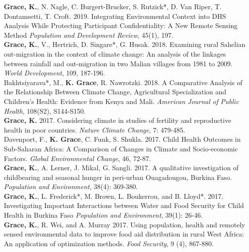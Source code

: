 \documentclass[11pt]{article} %
\begin{document}
\noindent
\textbf{Grace, K.}, N. Nagle, C. Burgert-Brucker, S. Rutzick*, D. Van Riper, T. Dontamsetti, T. Croft. 2019.  Integrating Environmental Context into DHS Analysis While Protecting Participant Confidentiality: A New Remote Sensing Method \textit{Population and Development Review}, 45(1), 197.\\

\noindent
\textbf{Grace, K.}, V., Hertrich, D. Singare*, G. Husak. 2018. Examining rural Sahelian out-migration in the context of climate change: An analysis of the linkages between rainfall and out-migration in two Malian villages from 1981 to 2009. \textit {World Development}, 109, 187-196.\\

\noindent
Bakhtsiyarava*, M., \textbf{K. Grace}, R. Nawrotzki. 2018. A Comparative Analysis of the Relationship Between Climate Change, Agricultural Specialization and Children's Health: Evidence from Kenya and Mali. \textit {American Journal of Public Health}, 108(S2), S144-S150.\\

\noindent
\textbf{Grace, K.} 2017. Considering climate in studies of fertility and reproductive health in poor countries. \textit{Nature Climate Change},  7: 479-485.\\

\noindent
Davenport, F.,  \textbf{K. Grace}, C. Funk, S. Shukla. 2017. Child Health Outcomes in Sub-Saharan Africa: A Comparison of Changes in Climate and Socio-economic Factors. \textit{Global Environmental Change}, 46, 72-87.\\

\noindent
\textbf{Grace, K.}, A. Lerner, J. Mikal, G. Sangli. 2017. A qualitative investigation of childbearing and seasonal hunger in peri-urban Ouagadougou, Burkina Faso.  \textit{Population and Environment}, 38(4): 369-380.\\

\noindent
\textbf{Grace, K.}, L. Frederick*, M. Brown, L. Boukerrou, and B. Lloyd*. 2017. Investigating Important Interactions between Water and Food Security for Child Health in Burkina Faso \textit{Population and Environment}, 39(1): 26-46.\\


\noindent
\textbf{Grace, K.}, R. Wei, and A. Murray 2017.  Using population, health and remotely sensed environmental data to improve food aid distribution in rural West Africa: An application of optimization methods. \textit{Food Security}, 9 (4), 867-880.\\
\end{document}

